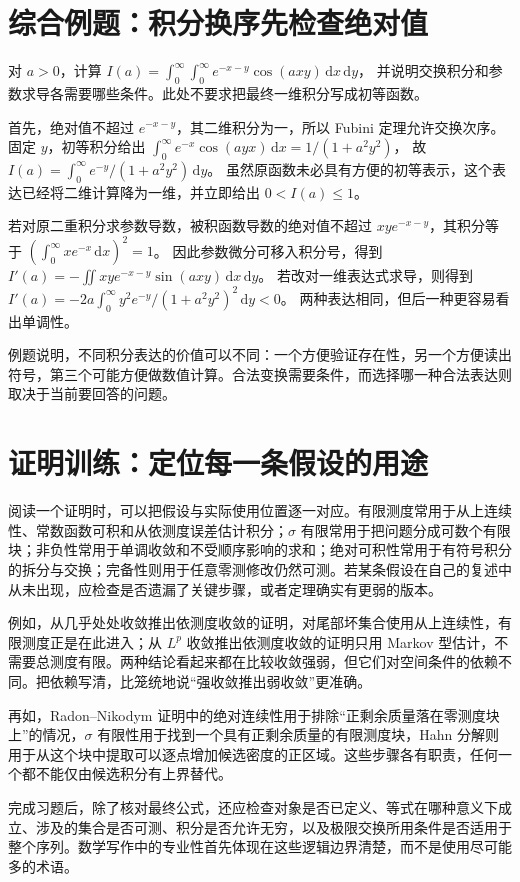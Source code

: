 \section{综合例题：积分换序先检查绝对值}
\begin{example}
对 $a>0$，计算
$I(a)=\int_0^\infty\int_0^\infty e^{-x-y}\cos(axy)\,\mathrm dx\,\mathrm dy$，
并说明交换积分和参数求导各需要哪些条件。此处不要求把最终一维积分写成初等函数。
\end{example}
\begin{solve}
首先，绝对值不超过 $e^{-x-y}$，其二维积分为一，所以 Fubini 定理允许交换次序。固定 $y$，初等积分给出
$\int_0^\infty e^{-x}\cos(ayx)\,\mathrm dx=1/(1+a^2y^2)$，
故
$I(a)=\int_0^\infty e^{-y}/(1+a^2y^2)\,\mathrm dy$。
虽然原函数未必具有方便的初等表示，这个表达已经将二维计算降为一维，并立即给出 $0<I(a)\leq1$。

若对原二重积分求参数导数，被积函数导数的绝对值不超过 $xy e^{-x-y}$，其积分等于
$(\int_0^\infty xe^{-x}\,\mathrm dx)^2=1$。
因此参数微分可移入积分号，得到
$I'(a)=-\iint xy e^{-x-y}\sin(axy)\,\mathrm dx\,\mathrm dy$。
若改对一维表达式求导，则得到
$I'(a)=-2a\int_0^\infty y^2e^{-y}/(1+a^2y^2)^2\,\mathrm dy<0$。
两种表达相同，但后一种更容易看出单调性。
\end{solve}
例题说明，不同积分表达的价值可以不同：一个方便验证存在性，另一个方便读出符号，第三个可能方便做数值计算。合法变换需要条件，而选择哪一种合法表达则取决于当前要回答的问题。

\section{证明训练：定位每一条假设的用途}
阅读一个证明时，可以把假设与实际使用位置逐一对应。有限测度常用于从上连续性、常数函数可积和从依测度误差估计积分；$\sigma$ 有限常用于把问题分成可数个有限块；非负性常用于单调收敛和不受顺序影响的求和；绝对可积性常用于有符号积分的拆分与交换；完备性则用于任意零测修改仍然可测。若某条假设在自己的复述中从未出现，应检查是否遗漏了关键步骤，或者定理确实有更弱的版本。

例如，从几乎处处收敛推出依测度收敛的证明，对尾部坏集合使用从上连续性，有限测度正是在此进入；从 $L^p$ 收敛推出依测度收敛的证明只用 Markov 型估计，不需要总测度有限。两种结论看起来都在比较收敛强弱，但它们对空间条件的依赖不同。把依赖写清，比笼统地说“强收敛推出弱收敛”更准确。

再如，Radon--Nikodym 证明中的绝对连续性用于排除“正剩余质量落在零测度块上”的情况，$\sigma$ 有限性用于找到一个具有正剩余质量的有限测度块，Hahn 分解则用于从这个块中提取可以逐点增加候选密度的正区域。这些步骤各有职责，任何一个都不能仅由候选积分有上界替代。

完成习题后，除了核对最终公式，还应检查对象是否已定义、等式在哪种意义下成立、涉及的集合是否可测、积分是否允许无穷，以及极限交换所用条件是否适用于整个序列。数学写作中的专业性首先体现在这些逻辑边界清楚，而不是使用尽可能多的术语。

